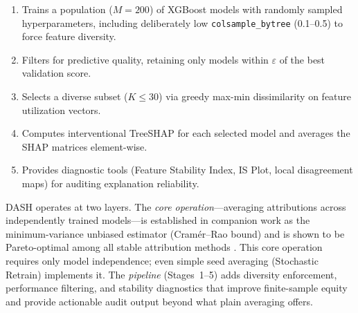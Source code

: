 \documentclass[11pt]{article}
\newcommand{\dash}{\textsc{DASH}}
\begin{document}
\begin{enumerate}
  \item Trains a population ($M = 200$) of XGBoost models with
    randomly sampled hyperparameters, including deliberately low
    \texttt{colsample\_bytree} (0.1--0.5) to force feature diversity.
  \item Filters for predictive quality, retaining only models within
    $\varepsilon$ of the best validation score.
  \item Selects a diverse subset ($K \leq 30$) via greedy max-min
    dissimilarity on feature utilization vectors.
  \item Computes interventional TreeSHAP for each selected model and
    averages the SHAP matrices element-wise.
  \item Provides diagnostic tools (Feature Stability Index, IS Plot,
    local disagreement maps) for auditing explanation reliability.
\end{enumerate}

\noindent \dash{} operates at two layers.
The \emph{core operation}---averaging attributions across independently
trained models---is established in companion work as the minimum-variance
unbiased estimator (Cram\'er--Rao bound) and is shown to be Pareto-optimal
among all stable attribution methods \citep{caraker2026impossibility}.  This core
operation requires only model independence; even simple seed averaging
(Stochastic Retrain) implements it.
The \emph{pipeline} (Stages~1--5) adds diversity enforcement,
performance filtering, and stability diagnostics that improve
finite-sample equity and provide actionable audit output beyond what
plain averaging offers.
\end{document}
